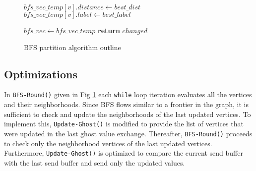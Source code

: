 \documentclass[conference]{IEEEtran}
\begin{document}
\begin{figure}
\begin{algorithmic}[1]
            \EndIf
            \EndFor
        \State $bfs\_vec\_temp[v].distance \gets best\_dist$
        \State $bfs\_vec\_temp[v].label \gets best\_label$

        \EndFor
        \State $bfs\_vec \gets bfs\_vec\_temp$
    \EndWhile
    \State \textbf{return} $changed$
    \EndProcedure


    \end{algorithmic}  
    \caption{BFS partition algorithm outline}  
    \label{algo:bfs-par-outline}  
\end{figure}

\subsection{Optimizations}
In \verb|BFS-Round()| given in Fig \ref{algo:bfs-par-outline} each \verb|while| loop iteration evaluates all the vertices and their neighborhoods. Since BFS flows similar to a frontier in the graph, it is sufficient to check and update the neighborhoods of the last updated vertices. To implement this, \verb|Update-Ghost()| is modified to provide the list of vertices that were updated in the last ghost value exchange. Thereafter, \verb|BFS-Round()| proceeds to check only the neighborhood vertices of the last updated vertices. Furthermore, \verb|Update-Ghost()| is optimized to compare the current send buffer with the last send buffer and send only the updated values.




\end{document}
